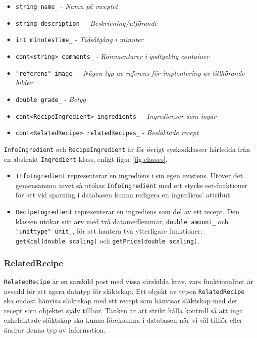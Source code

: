 \begin{itemize}
\item \verb+string name_+ - \emph{Namn på receptet}
\item \verb+string description_+ - \emph{Beskrivning/utförande}
\item \verb+int minutesTime_+ - \emph{Tidsåtgång i minuter}
\item \verb+cont<string> comments_+ - \emph{Kommentarer i godtycklig container}
\item \verb+"referens" image_+ - \emph{Någon typ av referens för implentering av tillhörande bilder}
\item \verb+double grade_+ - \emph{Betyg}
\end{itemize}

\begin{itemize}
\item \verb+cont<RecipeIngredient> ingredients_+ - \emph{Ingredienser som ingår}
\item \verb+cont<RelatedRecipe> relatedRecipes_+ - \emph{Besläktade recept}
\end{itemize}
%
\verb+InfoIngredient+ och \verb+RecipeIngredient+ är för övrigt syskonklasser härledda från en abstrakt \verb+Ingredient+-klass, enligt figur \ref{fig:classes}.

\begin{itemize}
\item \verb+InfoIngredient+ representerar en ingrediens i sin egen existens. Utöver det gemensamma arvet så utökas \verb+InfoIngredient+ med ett stycke set-funktioner för att vid sparning i databasen kunna redigera en ingrediens' attribut. 
\item \verb+RecipeIngredient+ representerar en ingrediens som del av ett recept. Den klassen utökar sitt arv med två datamedlemmar, \verb+double amount_+ och \verb+"unittype" unit_+, för att hantera två ytterligare funktioner: \verb+getKcal(double scaling)+ och \verb+getPrice(double scaling)+.
\end{itemize}
 
\subsubsection{RelatedRecipe}
\verb+RelatedRecipe+ är en särskild post med vissa särskilda krav, vars funktionalitet är avsedd för att agera datatyp för släktskap. Ett objekt av typen \verb+RelatedRecipe+ ska endast hänvisa släktskap med ett recept som hänvisar släktskap med det recept som objektet själv tillhör. Tanken är att strikt hålla kontroll så att inga enkelriktade släktskap ska kunna förekomma i databasen när vi väl tillför eller ändrar denna typ av information.

